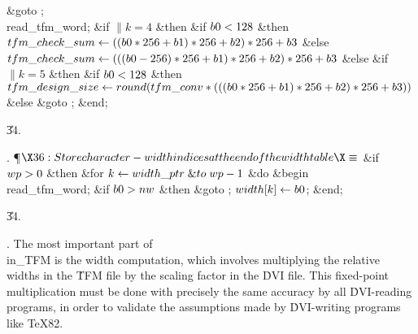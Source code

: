 \&{goto} ;\2\6
\\{read\_tfm\_word};\6
\&{if} $\|k=4$ \1\&{then}\6
\&{if} $\\{b0}<128$ \1\&{then}\5
$\\{tfm\_check\_sum}\gets((\\{b0}\ast256+\\{b1})\ast256+\\{b2})\ast256+\\{b3}$\6
\4\&{else} $\\{tfm\_check\_sum}\K(((\\{b0}-256)\ast256+\\{b1})\ast256+\\{b2})%
\ast256+\\{b3}$\2\6
\4\&{else} \&{if} $\|k=5$ \1\&{then}\6
\&{if} $\\{b0}<128$ \1\&{then}\5
$\\{tfm\_design\_size}\K\\{round}(\\{tfm\_conv}\ast(((\\{b0}\ast256+\\{b1})%
\ast256+\\{b2})\ast256+\\{b3}))$\6
\4\&{else} \&{goto} ;\2\2\2\6
\&{end};\2\par
\U34.\fi

. \P$\X36:Store character-width indices at the end of the \\{width} table\X%
\S$\6
\&{if} $\\{wp}>0$ \1\&{then}\6
\&{for} $\hbox{$k$}\gets\\{width\_ptr}\mathrel{\&{to}}\\{wp}-1$ \1\&{do}\6
\&{begin} \\{read\_tfm\_word};\6
\&{if} $\\{b0}>\\{nw}$ \1\&{then}\5
\&{goto} ;\2\6
$\\{width}[\hbox{$k$}]\gets\\{b0}$;\6
\&{end};\2\2\par
\U34.\fi

. The most important part of \\{in\_TFM} is the width computation, which
involves multiplying the relative widths in the \.{TFM} file by the
scaling factor in the \.{DVI} file. This fixed-point multiplication
must be done with precisely the same accuracy by all \.{DVI}-reading programs,
in order to validate the assumptions made by \.{DVI}-writing programs
like \TeX82.


